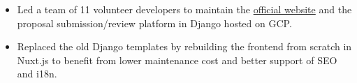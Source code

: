 \documentclass[letterpaper,11pt]{article}
\newcommand{\resumeItem}[1]{
  \item\small{
    {#1 \vspace{-2pt}}
  }
}
\newcommand{\resumeSubHeadingListEnd}{\end{itemize}}
\newcommand{\resumeItemListStart}{\begin{itemize}}
\newcommand{\resumeItemListEnd}{\end{itemize}\vspace{-5pt}}
\begin{document}
\begin{itemize}[leftmargin=16px]
      \resumeItemListStart
        \resumeItem{Led a team of 11 volunteer developers to maintain the \href{https://tw.pycon.org/2021}{official website} and the proposal submission/review platform in Django hosted on GCP.}
        \resumeItem{Replaced the old Django templates by rebuilding the frontend from scratch in Nuxt.js to benefit from lower maintenance cost and better support of SEO and i18n.}
      \resumeItemListEnd
    \resumeSubHeadingListEnd 
\end{document}
